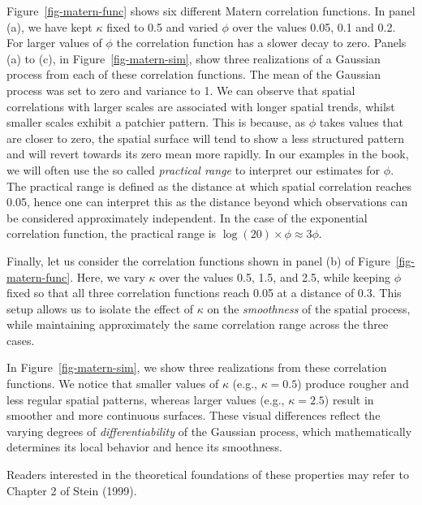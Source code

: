 \documentclass[
  letterpaper,
]{krantz}
\begin{document}
Figure~\ref{fig-matern-func} shows six different Matern correlation
functions. In panel (a), we have kept \(\kappa\) fixed to 0.5 and varied
\(\phi\) over the values 0.05, 0.1 and 0.2. For larger values of
\(\phi\) the correlation function has a slower decay to zero. Panels (a)
to (c), in Figure~\ref{fig-matern-sim}, show three realizations of a
Gaussian process from each of these correlation functions. The mean of
the Gaussian process was set to zero and variance to 1. We can observe
that spatial correlations with larger scales are associated with longer
spatial trends, whilst smaller scales exhibit a patchier pattern. This
is because, as \(\phi\) takes values that are closer to zero, the
spatial surface will tend to show a less structured pattern and will
revert towards its zero mean more rapidly. In our examples in the book,
we will often use the so called \emph{practical range} to interpret our
estimates for \(\phi\). The practical range is defined as the distance
at which spatial correlation reaches 0.05, hence one can interpret this
as the distance beyond which observations can be considered
approximately independent. In the case of the exponential correlation
function, the practical range is
\(\log(20) \times \phi \approx 3 \phi\).

Finally, let us consider the correlation functions shown in panel (b) of
Figure~\ref{fig-matern-func}. Here, we vary \(\kappa\) over the values
0.5, 1.5, and 2.5, while keeping \(\phi\) fixed so that all three
correlation functions reach 0.05 at a distance of 0.3. This setup allows
us to isolate the effect of \(\kappa\) on the \emph{smoothness} of the
spatial process, while maintaining approximately the same correlation
range across the three cases.

In Figure~\ref{fig-matern-sim}, we show three realizations from these
correlation functions. We notice that smaller values of \(\kappa\)
(e.g., \(\kappa = 0.5\)) produce rougher and less regular spatial
patterns, whereas larger values (e.g., \(\kappa = 2.5\)) result in
smoother and more continuous surfaces. These visual differences reflect
the varying degrees of \emph{differentiability} of the Gaussian process,
which mathematically determines its local behavior and hence its
smoothness.

Readers interested in the theoretical foundations of these properties
may refer to Chapter 2 of Stein (1999).
\end{document}
